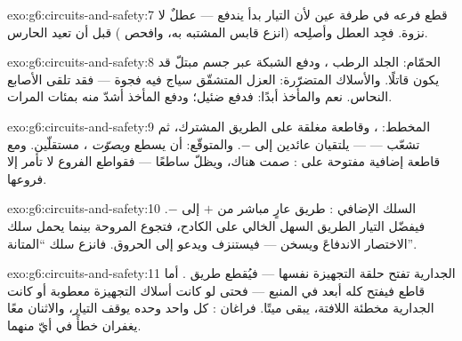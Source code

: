 \begin{solution}{exo:g6:circuits-and-safety:7}
قطع فرعه في طرفة عين لأن التيار بدأ يندفع --- عطلٌ لا نزوة.
فجِد العطل وأصلِحه (انزع قابس المشتبه به، وافحص ) قبل أن
تعيد الحارس.
\end{solution}

\begin{solution}{exo:g6:circuits-and-safety:8}
الحمّام: الجلد الرطب ، ودفع الشبكة عبر جسم مبتلّ قد يكون
قاتلًا. والأسلاك المتضرّرة: العزل المتشقّق سياج فيه فجوة ---
فقد تلقى الأصابع النحاس.  نعم والمأخذ أبدًا: فدفع
 ضئيل؛ ودفع المأخذ أشدّ منه بمئات المرات.
\end{solution}

\begin{solution}{exo:g6:circuits-and-safety:9}
المخطط: ، وقاطعة مغلقة على الطريق المشترك، ثم تشعّب ---
    --- يلتقيان عائدين إلى $-$. والمتوقّع:
أن يسطع  \emph{ويصوّت} ، مستقلّين. ومع قاطعة
إضافية مفتوحة على  : صمت هناك، ويظلّ  ساطعًا
--- فقواطع الفروع لا تأمر إلا فروعها.
\end{solution}

\begin{solution}{exo:g6:circuits-and-safety:10}
السلك الإضافي : طريق عارٍ مباشر من $+$ إلى $-$.
فيفضّل التيار الطريق السهل الخالي على  الكادح، فتجوع
المروحة بينما يحمل سلك الاختصار الاندفاعَ ويسخن --- فيستنزف
 ويدعو إلى الحروق. فانزع سلك ``المتانة''.
\end{solution}

\begin{solution}{exo:g6:circuits-and-safety:11}
 الجدارية تفتح حلقة التجهيزة نفسها --- فيُقطع طريق
. أما قاطع  فيفتح  كله أبعد في المنبع ---
فحتى لو كانت أسلاك التجهيزة معطوبة أو كانت  الجدارية
مخطئة اللافتة، يبقى  ميتًا. فراغان : كل واحد
وحده يوقف التيار، والاثنان معًا يغفران خطأً في أيّ منهما.
\end{solution}

